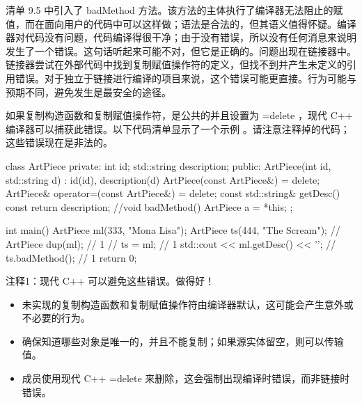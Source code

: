 清单 9.5 中引入了 badMethod 方法。该方法的主体执行了编译器无法阻止的赋值，而在面向用户的代码中可以这样做；语法是合法的，但其语义值得怀疑。编译器对代码没有问题，代码编译得很干净；由于没有错误，所以没有任何消息来说明发生了一个错误。这句话听起来可能不对，但它是正确的。问题出现在链接器中。链接器尝试在外部代码中找到复制赋值操作符的定义，但找不到并产生未定义的引用错误。对于独立于链接进行编译的项目来说，这个错误可能更直接。行为可能与预期不同，避免发生是最安全的途径。

如果复制构造函数和复制赋值操作符，是公共的并且设置为 =delete ，现代 C++ 编译器可以捕获此错误。以下代码清单显示了一个示例 。请注意注释掉的代码；这些错误现在是非法的。


\begin{cpp}
class ArtPiece {
private:
  int id;
  std::string description;
public:
  ArtPiece(int id, std::string d) : id(id), description(d) {}
  ArtPiece(const ArtPiece&) = delete;
  ArtPiece& operator=(const ArtPiece&) = delete;
  const std::string& getDesc() const { return description; }
  //void badMethod() { ArtPiece a = *this; }
};

int main() {
  ArtPiece ml(333, "Mona Lisa");
  ArtPiece ts(444, "The Scream");
  // ArtPiece dup(ml); // 1
  // ts = ml; // 1
  std::cout << ml.getDesc() << '\n';
  // ts.badMethod(); // 1
  return 0;
}
\end{cpp}

{\footnotesize
注释1：现代 C++ 可以避免这些错误。做得好！
}


\begin{itemize}
\item
未实现的复制构造函数和复制赋值操作符由编译器默认，这可能会产生意外或不必要的行为。

\item
确保知道哪些对象是唯一的，并且不能复制；如果源实体留空，则可以传输值。

\item
成员使用现代 C++ =delete 来删除，这会强制出现编译时错误，而非链接时错误。
\end{itemize}
